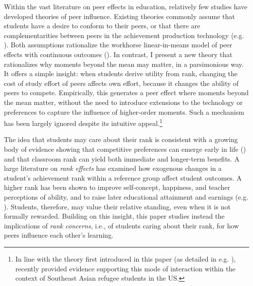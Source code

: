 Within the vast literature on peer effects in education, relatively few studies have developed theories of peer influence. Existing theories commonly assume that students have a desire to conform to their peers, or that there are complementarities between peers in the achievement production technology (e.g. \cite*{brock2001discrete,durlauf2006multinomial,calvo2009peer,fruehwirth2013identifying,conley2024social}). Both assumptions rationalize the workhorse linear-in-means model of peer effects with continuous outcomes (\cite*{blume2015linear}). In contrast, I present a new theory that rationalizes why moments beyond the mean may matter, in a parsimonious way. It offers a simple insight: when students derive utility from rank, changing the cost of study effort of peers affects own effort, because it changes the ability of peers to compete. Empirically, this generates a peer effect where moments beyond the mean matter, without the need to introduce extensions to the technology or preferences to capture the influence of higher-order moments. Such a mechanism has been largely ignored despite its intuitive appeal.\footnote{In line with the theory first introduced in this paper (as detailed in e.g. \cite{tincani2017heterogeneous}), \cite{rosenzweig2023classroom} recently provided evidence supporting this mode of interaction within the context of Southeast Asian refugee students in the US.} \par 
 
The idea that students may care about their rank is consistent with a growing body of evidence showing that competitive preferences can emerge early in life (\cite{sutter2015gender,page2017older}) and that classroom rank can yield both immediate and longer-term benefits. A large literature on {\itshape rank effects} has examined how exogenous changes in a student’s achievement rank within a reference group affect student outcomes. A higher rank has been shown to improve self-concept, happiness, and teacher perceptions of ability, and to raise later educational attainment and earnings (e.g. \cite{zeidner1999big,marsh2007big,elsner2017big,elsner2018rank,murphy2020top,denning2023class,ladant2024essential,carneiro2025effect}). Students, therefore, may value their relative standing, even when it is not formally rewarded. Building on this insight, this paper studies instead the implications of {\itshape rank concerns}, i.e., of students caring about their rank, for how peers influence each other's learning.\par  


